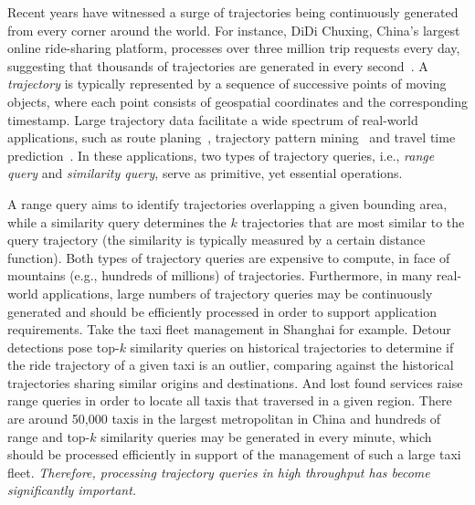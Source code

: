 \documentclass[10pt,conference,letterpaper]{IEEEtran}
\begin{document}
Recent years have witnessed a surge of trajectories being continuously generated from every corner around the world.
For instance, DiDi Chuxing, China's largest online ride-sharing platform, processes over three million trip requests every day, suggesting that thousands of trajectories are generated in every second~\cite{DidiExample}.
A \emph{trajectory} is typically represented by a sequence of successive points of moving objects, where each point consists of geospatial coordinates and the corresponding timestamp.
Large trajectory data facilitate a wide spectrum of real-world applications, such as route planing~\cite{RoutePlan}, trajectory pattern mining~\cite{DBLP:journals/tkde/ZhengZYSZ14} and travel time prediction~\cite{DBLP:conf/gis/LeeSCC12}.
In these applications, two types of trajectory queries, i.e., \emph{range query} and \emph{similarity query}, serve as primitive, yet essential operations.

A range query aims to identify trajectories overlapping a given bounding area, while a similarity query determines the $k$ trajectories that are most similar to the query trajectory (the similarity is typically measured by a certain distance function).
Both types of trajectory queries are expensive to compute, in face of mountains (e.g., hundreds of millions) of trajectories.
Furthermore, in many real-world applications, large numbers of trajectory queries may be continuously generated and should be efficiently processed in order to support application requirements. Take the taxi fleet management in Shanghai for example. Detour detections pose top-$k$ similarity queries on historical trajectories to determine if the ride trajectory of a given taxi is an outlier, comparing against the historical trajectories sharing similar origins and destinations. And lost found services raise range queries in order to locate all taxis that traversed in a given region. There are around 50,000 taxis in the largest metropolitan in China and hundreds of range and top-$k$ similarity queries may be generated in every minute, which should be processed efficiently in support of the management of such a large taxi fleet. \emph{Therefore, processing trajectory queries in high throughput has become significantly important.}
\end{document}
